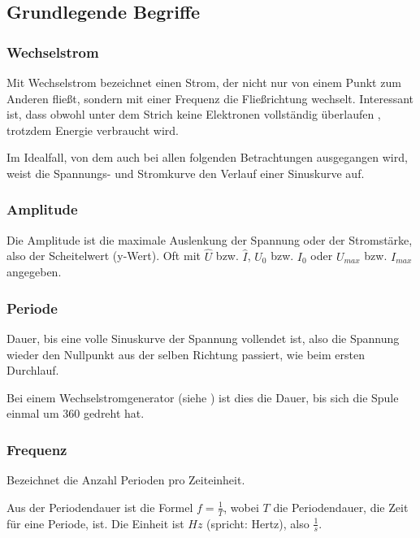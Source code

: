 


\subsection{Grundlegende Begriffe}		\label{subsec:ErlaeuterungenGrundlegend}


\subsubsection{Wechselstrom}

Mit Wechselstrom bezeichnet einen Strom, der nicht nur von einem Punkt zum Anderen fließt, sondern mit einer Frequenz die Fließrichtung wechselt. Interessant ist, dass obwohl unter dem Strich keine Elektronen vollständig \glqq überlaufen\grqq{} , trotzdem Energie verbraucht wird.

Im Idealfall, von dem auch bei allen folgenden Betrachtungen ausgegangen wird, weist die Spannungs- und Stromkurve den Verlauf einer Sinuskurve auf.


\subsubsection{Amplitude}

Die Amplitude ist die maximale Auslenkung der Spannung oder der Stromstärke, also der Scheitelwert (y-Wert). Oft mit $\hat{U}$ bzw. $\hat{I}$, $U_{0}$ bzw. $I_{0}$ oder $U_{max}$ bzw. $I_{max}$ angegeben.


\subsubsection{Periode}

Dauer, bis eine volle Sinuskurve der Spannung vollendet ist, also die Spannung wieder den Nullpunkt aus der selben Richtung passiert, wie beim ersten Durchlauf.

Bei einem Wechselstromgenerator (siehe ) ist dies die Dauer, bis sich die Spule einmal um 360\degree{} gedreht hat.


\subsubsection{Frequenz}

Bezeichnet die Anzahl Perioden pro Zeiteinheit. 

\noindent Aus der Periodendauer ist die Formel $f=\frac{1}{T}$, wobei $T$ die Periodendauer, die Zeit für eine Periode, ist. Die Einheit ist $Hz$ (spricht: \glqq Hertz\grqq), also $\frac{1}{s}$.



